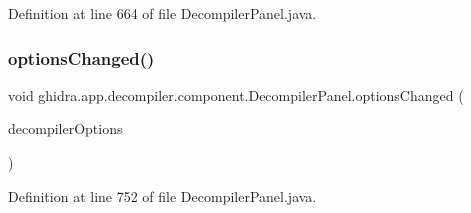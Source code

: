Definition at line 664 of file Decompiler\+Panel.\+java.

\mbox{\label{classghidra_1_1app_1_1decompiler_1_1component_1_1_decompiler_panel_ad34eb82dfc3a0760d3ed82097d0fb1df}} 
\subsubsection{\texorpdfstring{optionsChanged()}{optionsChanged()}}
{\footnotesize\ttfamily void ghidra.\+app.\+decompiler.\+component.\+Decompiler\+Panel.\+options\+Changed (\begin{DoxyParamCaption}\item[{\mbox{\hyperlink{classghidra_1_1app_1_1decompiler_1_1_decompile_options}{Decompile\+Options}}}]{decompiler\+Options }\end{DoxyParamCaption})\hspace{0.3cm}{\ttfamily [inline]}}



Definition at line 752 of file Decompiler\+Panel.\+java.

